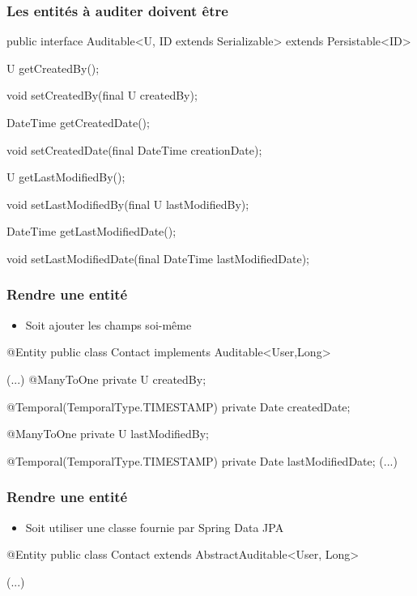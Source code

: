 \begin{frame}[fragile]
 \frametitle{Les entités à auditer doivent être }

 \begin{javacode}
public interface Auditable<U, ID extends Serializable> 
                 extends Persistable<ID> {

  U getCreatedBy();

  void setCreatedBy(final U createdBy);
  
  DateTime getCreatedDate();

  void setCreatedDate(final DateTime creationDate);

  U getLastModifiedBy();

  void setLastModifiedBy(final U lastModifiedBy);
  
  DateTime getLastModifiedDate();

  void setLastModifiedDate(final DateTime lastModifiedDate);
}
 \end{javacode}
\end{frame}

\begin{frame}[fragile]
 \frametitle{Rendre une entité }

 \begin{itemize}
  \item Soit ajouter les champs soi-même
 \end{itemize}

 \begin{javacode}
@Entity
public class Contact implements Auditable<User,Long> { 
  (...) 
  @ManyToOne
  private U createdBy;

  @Temporal(TemporalType.TIMESTAMP)
  private Date createdDate;

  @ManyToOne
  private U lastModifiedBy;

  @Temporal(TemporalType.TIMESTAMP)
  private Date lastModifiedDate;  
  (...)   
}
 \end{javacode}
\end{frame}

\begin{frame}[fragile]
 \frametitle{Rendre une entité }

 \begin{itemize}
  \item Soit utiliser une classe fournie par Spring Data JPA
 \end{itemize}

 \begin{javacode}
@Entity
public class Contact extends AbstractAuditable<User, Long> {
 
 (...)
  
}
 \end{javacode}
\end{frame}


